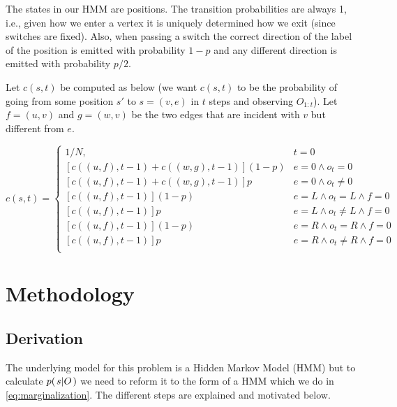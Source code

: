 \documentclass[a4paper,11pt]{kth-mag}
\begin{document}
    The states in our HMM are positions. The transition probabilities are
    always 1, i.e., given how we enter a vertex it is uniquely determined how
    we exit (since switches are fixed). Also, when passing a switch the correct
    direction of the label of the position is emitted with probability $1-p$
    and any different direction is emitted with probability $p/2$.

    Let $c(s,t)$ be computed as below (we want $c(s,t)$ to be the probability
    of going from some position $s'$ to $s=(v,e)$ in $t$ steps and observing
    $O_{1:t}$). Let $f=(u,v)$ and $g=(w,v)$ be the two edges that are incident
    with $v$ but different from $e$.

    \begin{equation}
        c(s,t) =
        \begin{cases}
            1/N, & t = 0 \\
            \left[c((u,f),t-1) + c((w,g),t-1)\right](1-p) & e = 0 \wedge o_t = 0 \\
            \left[c((u,f),t-1) + c((w,g),t-1)\right]p     & e = 0 \wedge o_t \neq 0 \\
            \left[c((u,f),t-1)               \right](1-p) & e = L \wedge o_t = L \wedge f = 0 \\
            \left[c((u,f),t-1)               \right]p     & e = L \wedge o_t \neq L \wedge f = 0 \\
            \left[c((u,f),t-1)               \right](1-p) & e = R \wedge o_t = R \wedge f = 0 \\
            \left[c((u,f),t-1)               \right]p     & e = R \wedge o_t \neq R \wedge f = 0 \\
        \end{cases}
    \end{equation}

    \chapter{Methodology}
        \section{Derivation}
        The underlying model for this problem is a Hidden Markov Model (HMM) but to calculate $p{(\left. s \middle\vert O \right.)}$ we need to reform it to the form of a HMM which we do in \eqref{eq:marginalization}. The different steps are explained and motivated below.
\end{document}
